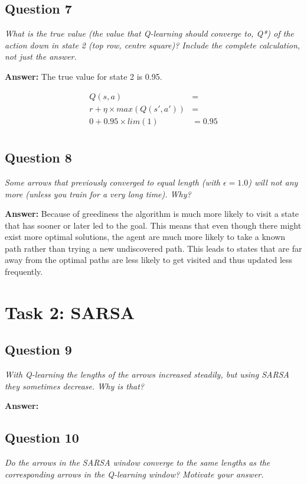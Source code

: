 \documentclass[a4paper]{article}
\begin{document}
\subsection*{Question 7}
\emph{What is the true value (the value that Q-learning should converge
to, Q*) of the action down in state 2 (top row, centre square)? Include the complete calculation, not just the answer.}

\textbf{Answer:} The true value for state 2 is 0.95.

\begin{align*}
Q(s, a)                    &= \\
r + \eta \times max(Q(s', a'))   &= \\
0 + 0.95 \times lim(1) &= 0.95 \\
\end{align*}

\subsection*{Question 8}
\emph{Some arrows that previously converged to equal length (with $\epsilon = 1.0$) will not any more (unless you train for a very long time). Why?}

\textbf{Answer:} Because of greediness the algorithm is much more likely to visit a state that has sooner or later led to the goal. This means that even though there might exist more optimal solutions, the agent are much more likely to take a known path rather than trying a new undiscovered path. 
This leads to states that are far away from the optimal paths are less likely to get visited and thus updated less frequently.

\section{Task 2: SARSA}

\subsection*{Question 9}
\emph{With Q-learning the lengths of the arrows increased steadily, but
using SARSA they sometimes decrease. Why is that?}

\textbf{Answer:} 

\subsection*{Question 10}
\emph{Do the arrows in the SARSA window converge to the same
lengths as the corresponding arrows in the Q-learning window? Motivate your answer.}
\end{document}
